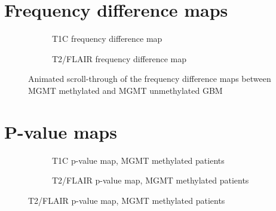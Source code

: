 \begin{subappendices}
        \section{Frequency difference maps}
        \begin{figure}[H]
        \centering
        \begin{subfigure}[t]{0.4\textwidth}
            \centering
            \caption{\gls{T1C} frequency difference map}\label{fig:HGG_loc_T1_freq_dif_gif}
        \end{subfigure}
        \hfill
        \begin{subfigure}[t]{0.4\textwidth}
            \centering
            \caption{\gls{T2}/\gls{FLAIR} frequency difference map}\label{fig:HGG_loc_T2_freq_dif_gif}
        \end{subfigure}
        \caption{Animated scroll-through of the frequency difference maps between \gls{MGMT} methylated and \gls{MGMT} unmethylated \gls{GBM}}\label{fig:HGG_loc_freq_map_full}
        \end{figure}

        \newpage
        \section{P-value maps}
        \begin{figure}[H]
            \centering
            \begin{subfigure}[t]{0.4\textwidth}
                \centering
                \caption{\acrshort{T1C} p-value map, \acrshort{MGMT} methylated patients}\label{fig:HGG_loc_T1_p_value_map_methylated}
            \end{subfigure}
            \hfill
            \begin{subfigure}[t]{0.4\textwidth}
                \centering
                \caption{\acrshort{T2}/\acrshort{FLAIR} p-value map, \acrshort{MGMT} methylated patients}\label{fig:HGG_loc_T2_p_value_map_methylated}
            \end{subfigure}


\end{figure}
\end{subappendices}
